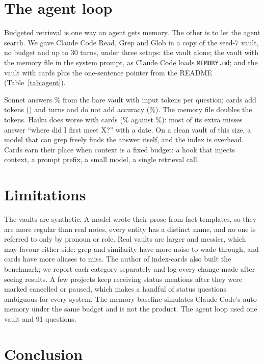 \documentclass[11pt]{article}
\begin{document}
\section{The agent loop}\label{sec:agent}



Budgeted retrieval is one way an agent gets memory. The other is to let the agent search. We gave Claude Code Read,
Grep and Glob in a copy of the seed-7 vault, no budget and up to 30 turns, under three setups: the vault alone; the
vault with the memory file in the system prompt, as Claude Code loads \texttt{MEMORY.md}; and the vault with cards
plus the one-sentence pointer from the README (Table~\ref{tab:agent}).

Sonnet answers \AgSPlainAcc\% from the bare vault with \AgSPlainTok{} input tokens per question; cards add tokens
(\AgSCardsTok) and turns and do not add accuracy (\AgSCardsAcc\%). The memory file doubles the tokens. Haiku does
worse with cards (\AgHCardsAcc\% against \AgHPlainAcc\%): most of its extra misses answer ``where did I first meet
X?'' with a date. On a clean vault of this size, a model that can grep freely finds the answer itself, and the index
is overhead. Cards earn their place when context is a fixed budget: a hook that injects context, a prompt prefix,
a small model, a single retrieval call.

\section{Limitations}

The vaults are synthetic. A model wrote their prose from fact templates, so they are more regular than real notes,
every entity has a distinct name, and no one is referred to only by pronoun or role. Real vaults are larger and
messier, which may favour either side: grep and similarity have more noise to wade through, and cards have more
aliases to miss. The author of index-cards also built the benchmark; we report each category separately and log
every change made after seeing results. A few projects keep receiving status mentions after they were marked
cancelled or paused, which makes a handful of status questions ambiguous for every system. The memory baseline
simulates Claude Code's auto memory under the same budget and is not the product. The agent loop used one vault and
91 questions.

\section{Conclusion}
\end{document}
